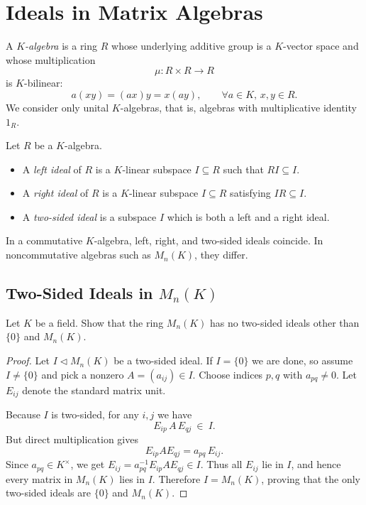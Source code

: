 \section{Ideals in Matrix Algebras}

\begin{definition}[$K$-algebra]
A \emph{$K$-algebra} is a ring $R$ whose underlying additive group is a $K$-vector space and whose multiplication
\[
\mu: R\times R \to R
\]
is $K$-bilinear:
\[
a(xy)=(ax)y = x(ay), \qquad \forall a\in K,\, x,y\in R.
\]
We consider only unital $K$-algebras, that is, algebras with multiplicative identity $1_R$.
\end{definition}

\begin{definition}
Let $R$ be a $K$-algebra.
\begin{itemize}
    \item A \emph{left ideal} of $R$ is a $K$-linear subspace $I\subseteq R$ such that $RI \subseteq I$.
    \item A \emph{right ideal} of $R$ is a $K$-linear subspace $I\subseteq R$ satisfying $IR \subseteq I$.
    \item A \emph{two-sided ideal} is a subspace $I$ which is both a left and a right ideal.
\end{itemize}
\end{definition}

\begin{remark}
In a commutative $K$-algebra, left, right, and two-sided ideals coincide.  
In noncommutative algebras such as $M_n(K)$, they differ.
\end{remark}

\subsection{Two-Sided Ideals in $M_n(K)$}

\begin{exercise}
Let $K$ be a field. Show that the ring $M_n(K)$ has no two-sided ideals other than $\{0\}$ and $M_n(K)$.
\end{exercise}

\begin{proof}
Let $I\lhd M_n(K)$ be a two-sided ideal.  
If $I=\{0\}$ we are done, so assume $I\ne\{0\}$ and pick a nonzero $A=(a_{ij})\in I$.
Choose indices $p,q$ with $a_{pq}\neq 0$.  
Let $E_{ij}$ denote the standard matrix unit.

Because $I$ is two-sided, for any $i,j$ we have
\[
E_{ip}\,A\,E_{qj}\ \in\ I.
\]
But direct multiplication gives
\[
E_{ip}A E_{qj}=a_{pq}\,E_{ij}.
\]
Since $a_{pq}\in K^\times$, we get $E_{ij}=a_{pq}^{-1}E_{ip}AE_{qj}\in I$.  
Thus all $E_{ij}$ lie in $I$, and hence every matrix in $M_n(K)$ lies in $I$.  
Therefore $I=M_n(K)$, proving that the only two-sided ideals are $\{0\}$ and $M_n(K)$.
\end{proof}

